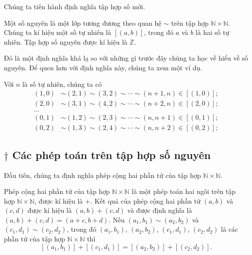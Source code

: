 Chúng ta tiến hành định nghĩa tập hợp số mới.
\begin{definition}
	Một số nguyên là một lớp tương đương theo quan hệ $\sim$ trên tập hợp $\mathbb{N}\times\mathbb{N}$. Chúng ta kí hiệu một số tự nhiên là $[(a, b)]$, trong đó $a$ và $b$ là hai số tự nhiên. Tập hợp số nguyên được kí hiệu là $\mathbb{Z}$.
\end{definition}

Đó là một định nghĩa khá lạ so với những gì trước đây chúng ta học về hiểu về số nguyên. Để quen hơn với định nghĩa này, chúng ta xem một ví dụ.
\begin{example}
	Với $n$ là số tự nhiên, chúng ta có
	\begin{align*}
		(1, 0) & \sim (2, 1) \sim (3, 2) \sim \cdots \sim (n+1, n) \in [(1, 0)]; \\
		(2, 0) & \sim (3, 1) \sim (4, 2) \sim \cdots \sim (n+2, n) \in [(2, 0)]; \\
		\ldots                                                                   \\
		(0, 1) & \sim (1, 2) \sim (2, 3) \sim \cdots \sim (n, n+1) \in [(0, 1)]; \\
		(0, 2) & \sim (1, 3) \sim (2, 4) \sim \cdots \sim (n, n+2) \in [(0, 2)];
	\end{align*}
\end{example}

\subsection{$\dagger$ Các phép toán trên tập hợp số nguyên}

Đầu tiên, chúng ta định nghĩa phép cộng hai phần tử của tập hợp $\mathbb{N}\times\mathbb{N}$.
\begin{proposition}
	Phép cộng hai phần tử của tập hợp $\mathbb{N}\times\mathbb{N}$ là một phép toán hai ngôi trên tập hợp $\mathbb{N}\times\mathbb{N}$, được kí hiệu là $+$. Kết quả của phép cộng hai phần tử $(a, b)$ và $(c, d)$ được kí hiệu là $(a, b) + (c, d)$ và được định nghĩa là $(a, b) + (c, d) = (a+c, b+d)$. Nếu $(a_{1}, b_{1}) \sim (a_{2}, b_{2})$ và $(c_{1}, d_{1})\sim (c_{2}, d_{2})$, trong đó $(a_{1}, b_{1})$, $(a_{2}, b_{2})$, $(c_{1}, d_{1})$, $(c_{2}, d_{2})$ là các phần tử của tập hợp $\mathbb{N}\times\mathbb{N}$ thì
	\[
		[(a_{1}, b_{1})] + [(c_{1}, d_{1})] = [(a_{2}, b_{2})] + [(c_{2}, d_{2})].
	\]
\end{proposition}

